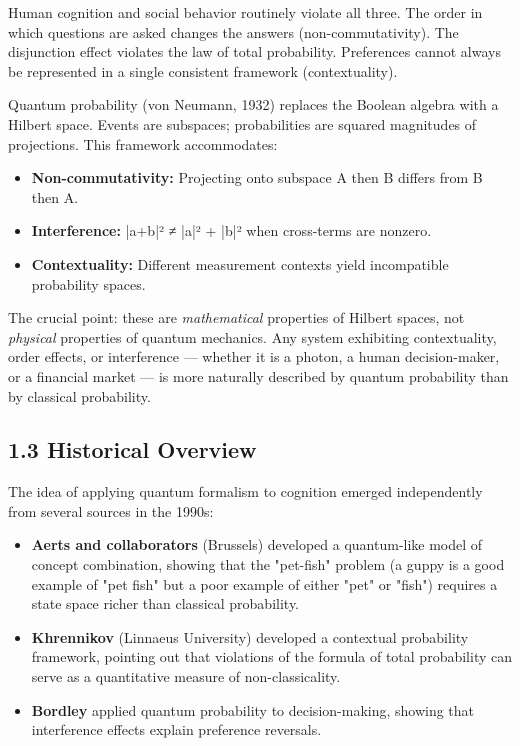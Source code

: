 \documentclass[11pt]{article}
\begin{document}
Human cognition and social behavior routinely violate all three. The order in
which questions are asked changes the answers (non-commutativity). The disjunction
effect violates the law of total probability. Preferences cannot always be
represented in a single consistent framework (contextuality).

Quantum probability (von Neumann, 1932) replaces the Boolean algebra with a
Hilbert space. Events are subspaces; probabilities are squared magnitudes of
projections. This framework accommodates:
\begin{itemize}
\item \textbf{Non-commutativity:} Projecting onto subspace A then B differs from B then A.
\item \textbf{Interference:} |a+b|² ≠ |a|² + |b|² when cross-terms are nonzero.
\item \textbf{Contextuality:} Different measurement contexts yield incompatible probability
spaces.
\end{itemize}

The crucial point: these are \emph{mathematical} properties of Hilbert spaces, not
\emph{physical} properties of quantum mechanics. Any system exhibiting contextuality,
order effects, or interference --- whether it is a photon, a human decision-maker,
or a financial market --- is more naturally described by quantum probability than
by classical probability.
\subsection{1.3 Historical Overview}
\label{sec:org9753fb5}

The idea of applying quantum formalism to cognition emerged independently from
several sources in the 1990s:

\begin{itemize}
\item \textbf{Aerts and collaborators} (Brussels) developed a quantum-like model of concept
combination, showing that the "pet-fish" problem (a guppy is a good example of
"pet fish" but a poor example of either "pet" or "fish") requires a state space
richer than classical probability.
\item \textbf{Khrennikov} (Linnaeus University) developed a contextual probability framework,
pointing out that violations of the formula of total probability can serve as
a quantitative measure of non-classicality.
\item \textbf{Bordley} applied quantum probability to decision-making, showing that
interference effects explain preference reversals.
\end{itemize}
\end{document}
